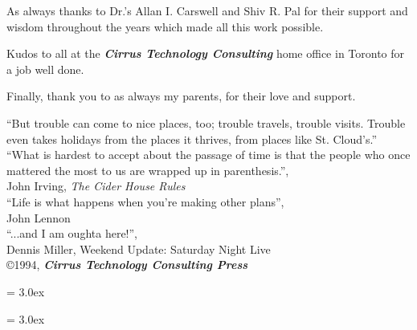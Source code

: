 As always thanks to Dr.'s Allan I. Carswell and Shiv R. Pal for their
support and wisdom throughout the years which made all this work
possible.

Kudos to all at the {\bf\sl Cirrus Technology Consulting} home office
in Toronto for a job well done.

Finally, thank you to as always my parents, for their love and support. 

\newpage
\noindent
``But trouble can come to nice places, too; trouble travels,
trouble visits. Trouble even takes holidays from the places
it thrives, from places like St. Cloud's.''\\


\noindent
``What is hardest to accept about the passage of time
is that the people who once mattered the most to us
are wrapped up in parenthesis.'',\\
John Irving, {\em The Cider House Rules}\\

\vspace{0.1in}  
\noindent
``Life is what happens when you're making other plans'',\\ 
John Lennon\\

\vspace{0.1in}  
\noindent
``...and I am oughta here!'',\\
Dennis Miller, Weekend Update: Saturday Night Live\\

\vspace{0.2in}  
\noindent
\copyright 1994, {\bf\sl Cirrus Technology Consulting Press} 
\clearpage

\baselineskip = 3.0ex

\tableofcontents
\clearpage
{}
\listoftables
\clearpage
{}
\listoffigures
\clearpage

\setcounter{page}{1}





\clearpage

\baselineskip = 3.0ex





